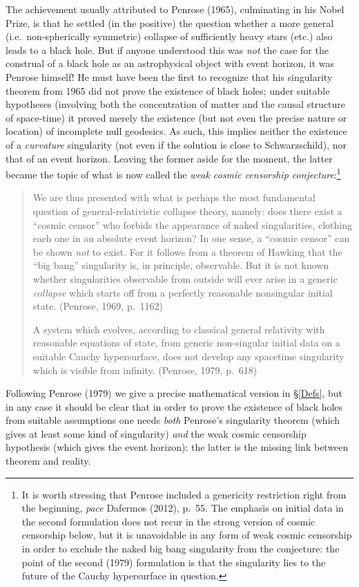 \documentclass[11pt,a4paper]{article}
\begin{document}
The achievement  usually attributed to Penrose (1965), culminating in his Nobel Prize, is that he 
settled (in the positive) the question whether a more general (i.e.\ non-spherically symmetric) collapse of sufficiently heavy stars (etc.) also leads to a black hole. But
if anyone understood this was \emph{not} the case for the construal of a black hole as an astrophysical object with event horizon,
  it was Penrose himself! He must have been the first to recognize that his singularity theorem from 1965 did not prove the existence of black holes; under suitable hypotheses (involving both the concentration of matter and the causal structure of space-time) it  proved merely the existence (but not even the precise nature or location) of incomplete null geodesics. As such, this implies neither the existence of a \emph{curvature} singularity (not even if the solution is close to Schwarzschild), nor that of an event horizon. 
   Leaving the former aside for the moment, the latter became the topic of what is now called  the  \emph{weak cosmic censorship conjecture}:\footnote{\label{PD} It is worth stressing that Penrose included a genericity restriction right from the beginning, \emph{pace}  Dafermos (2012), p.\ 55.
 The emphasis on initial data in the second formulation does not recur in the strong version of cosmic censorship below, but it is unavoidable in any form of weak cosmic censorship in order to exclude the naked big bang singularity from the conjecture: the point of the second (1979) formulation is that the singularity lies to the future of the Cauchy hypersurface in question. 
    }
  \begin{quote}
\begin{small}
We are thus presented with what is perhaps the most fundamental question of general-relativistic collapse theory, namely: does there exist a ``cosmic censor'' who forbids the appearance of naked singularities, clothing each one in an absolute event horizon? In one sense, a  ``cosmic censor'' can be shown \emph{not} to exist. For it follows from a theorem of Hawking that the ``big bang'' singularity is, in principle, observable. But it is not known whether singularities observable from outside will ever arise in a generic \emph{collapse} which starts off from a perfectly reasonable nonsingular initial state.  (Penrose, 1969,  p.\ 1162)

A system which evolves, according to classical general relativity with reasonable equations of state, from generic non-singular  initial data on a suitable Cauchy hypersurface, does not develop any spacetime singularity which is visible 
from infinity. (Penrose, 1979, p.\ 618)
\end{small}
\end{quote}
Following Penrose (1979) we give a precise mathematical version in \S\ref{Defs}, but in any case it should be clear that in order to prove the existence of black holes from suitable assumptions one needs \emph{both} Penrose's singularity theorem (which gives at least some kind of singularity) \emph{and} the weak cosmic censorship hypothesis (which gives the event horizon): the latter is the missing link between theorem and reality. 
\end{document}
